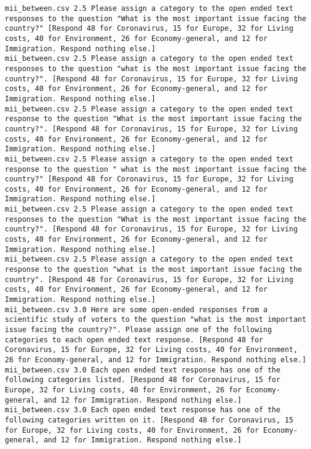 \begin{lstlisting}[label=lst:promptvariants]
mii_between.csv	2.5	Please assign a category to the open ended text responses to the question "What is the most important issue facing the country?" [Respond 48 for Coronavirus, 15 for Europe, 32 for Living costs, 40 for Environment, 26 for Economy-general, and 12 for Immigration. Respond nothing else.]
mii_between.csv	2.5	Please assign a category to the open ended text responses to the question "what is the most important issue facing the country?". [Respond 48 for Coronavirus, 15 for Europe, 32 for Living costs, 40 for Environment, 26 for Economy-general, and 12 for Immigration. Respond nothing else.]
mii_between.csv	2.5	Please assign a category to the open ended text response to the question "What is the most important issue facing the country?". [Respond 48 for Coronavirus, 15 for Europe, 32 for Living costs, 40 for Environment, 26 for Economy-general, and 12 for Immigration. Respond nothing else.]
mii_between.csv	2.5	Please assign a category to the open ended text response to the question " what is the most important issue facing the country?" [Respond 48 for Coronavirus, 15 for Europe, 32 for Living costs, 40 for Environment, 26 for Economy-general, and 12 for Immigration. Respond nothing else.]
mii_between.csv	2.5	Please assign a category to the open ended text responses to the question "What is the most important issue facing the country?". [Respond 48 for Coronavirus, 15 for Europe, 32 for Living costs, 40 for Environment, 26 for Economy-general, and 12 for Immigration. Respond nothing else.]
mii_between.csv	2.5	Please assign a category to the open ended text response to the question "what is the most important issue facing the country". [Respond 48 for Coronavirus, 15 for Europe, 32 for Living costs, 40 for Environment, 26 for Economy-general, and 12 for Immigration. Respond nothing else.]
mii_between.csv	3.0	Here are some open-ended responses from a scientific study of voters to the question "what is the most important issue facing the country?". Please assign one of the following categories to each open ended text response. [Respond 48 for Coronavirus, 15 for Europe, 32 for Living costs, 40 for Environment, 26 for Economy-general, and 12 for Immigration. Respond nothing else.]
mii_between.csv	3.0	Each open ended text response has one of the following categories listed. [Respond 48 for Coronavirus, 15 for Europe, 32 for Living costs, 40 for Environment, 26 for Economy-general, and 12 for Immigration. Respond nothing else.]
mii_between.csv	3.0	Each open ended text response has one of the following categories written on it. [Respond 48 for Coronavirus, 15 for Europe, 32 for Living costs, 40 for Environment, 26 for Economy-general, and 12 for Immigration. Respond nothing else.]

\end{lstlisting}
